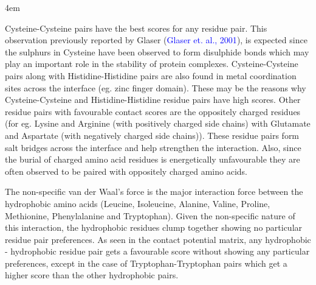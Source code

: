 \documentclass[a4paper, 12pt, twoside]{article}
\begin{document}
\par
\begingroup
\footnotesize
\leftskip4em
\rightskip\leftskip

Cysteine-Cysteine pairs have the best scores for any residue pair. This observation previously reported by Glaser (\textcolor{blue}{Glaser et. al., 2001}), is expected since the sulphurs in Cysteine have been observed to form disulphide bonds which  may play an important role in the stability of protein complexes. Cysteine-Cysteine pairs along with Histidine-Histidine pairs are also found in metal coordination sites across the interface (eg. zinc finger domain). These may be the reasons why Cysteine-Cysteine and Histidine-Histidine residue pairs have high scores. Other residue pairs with favourable contact scores are the oppositely charged residues (for eg. Lysine and Arginine (with positively charged side chains) with Glutamate and Aspartate (with negatively charged side chains)). These residue pairs form salt bridges across the interface and help strengthen the interaction. Also, since the burial of charged amino acid residues is energetically unfavourable they are often observed to be paired with oppositely charged amino acids.

The non-specific van der Waal's force is the major interaction force between the hydrophobic amino acids (Leucine, Isoleucine, Alanine, Valine, Proline, Methionine, Phenylalanine and Tryptophan). Given the non-specific nature of this interaction, the hydrophobic residues clump together showing no particular residue pair preferences. As seen in the contact potential matrix, any hydrophobic - hydrophobic residue pair gets a favourable score without showing any particular preferences, except in the case of Tryptophan-Tryptophan pairs which get a higher score than the other hydrophobic pairs.
\end{document}
